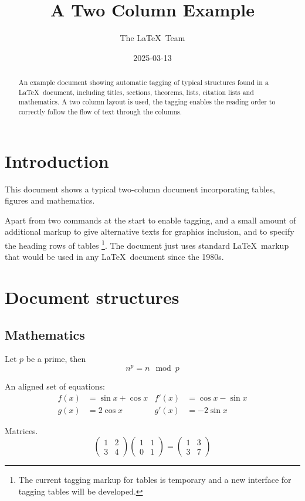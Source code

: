 \documentclass[a4paper,twocolumn]{article}
\begin{document}
\title{A Two Column Example}
\date{2025-03-13}
\author{The \LaTeX\ Team}

\pagestyle{headings}

\maketitle

\begin{abstract}
  An example document showing automatic tagging of typical structures
  found in a \LaTeX\ document, including titles, sections, theorems, lists,
  citation lists and mathematics. A two column layout is used, the
  tagging enables the reading order to correctly follow the flow of
  text through the columns.
\end{abstract}

\tableofcontents

\section{Introduction}

This document shows a typical two-column document incorporating tables, figures and mathematics.

Apart from two commands at the start to enable tagging, and a small
amount of additional markup to give alternative texts for graphics
inclusion, and to specify the heading rows of tables%
\footnote{The current tagging markup for tables is temporary and a new interface
for tagging tables will be developed.}. The document
just uses standard \LaTeX\ markup that would be used in any \LaTeX\
document since the 1980s.

\section{Document structures}

\subsection{Mathematics}

Let $p$ be a prime, then
\[n^p=n \mod p\]

An aligned set of equations:
\begin{align}
  f(x)&=\sin x + \cos x  & f'(x) &=\cos x - \sin x \\
  g(x)&=2\cos x          & g'(x) &= -2\sin x
\end{align}

Matrices.
\[
\begin{pmatrix}1&2\\3&4\end{pmatrix}
\begin{pmatrix}1&1\\0&1\end{pmatrix}
=
\begin{pmatrix}1&3\\3&7\end{pmatrix}
\]
\end{document}

